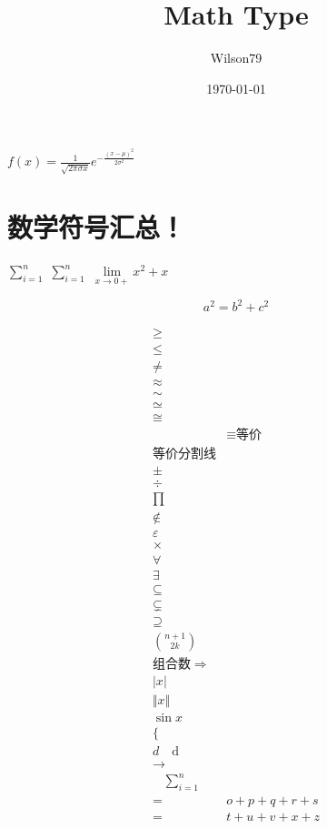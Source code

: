 \documentclass{article}
\title{Math Type}
\author{Wilson79}
\date{\today}
\begin{document}
 
    \tableofcontents %
    \maketitle %
    
    $f(x)=\frac{1}{\sqrt{2 \pi \sigma x}} e^{-\frac{(x-\mu)^{2}}{2 \sigma^{2}}}$

\section{数学符号汇总！}
    
    $\sum _{i=1}^{n}$ %
    $\sum \limits_{i=1}^{n}$
    $\lim\limits _{x \rightarrow 0+} x^2 + x$ 


    {\color{blue} \[a^2 = b ^2 + c^2 \tag{*}\]} %

    \[
    \begin{aligned}  %
        \geq \\ %
        \leq \\ %
        \neq \\ %
        \approx \\ %
        \sim \\ %
        \simeq \\ 
        \cong \\ %
        &\equiv \text{等价} \\ 等价
        \text{分割线} \\
        \pm \\ %
        \div \\ %
        \prod \\ %
        \notin \\ %
        \varepsilon \\
        \times \\ %
        \forall \\ %
        \exists \\ %
        \subseteq \\ %
        \subsetneq \\
        \supseteq \\
        \binom{n+1}{2k} \\ 组合数
        \Rightarrow \\ 
        \vert x \vert \\ %
        \Vert x \Vert \\ %
        \sin x \\ %
        \{  \\  %
        d \quad \mathrm{d} \\ %
        \rightarrow \\ %
        \quad %
        \sum\limits_{i=1}^{n} \\ %
        =& o+p+q+r+s \\ 
        =& t+u+v+x+z 
    \end{aligned}
    \]
    
\end{document}
